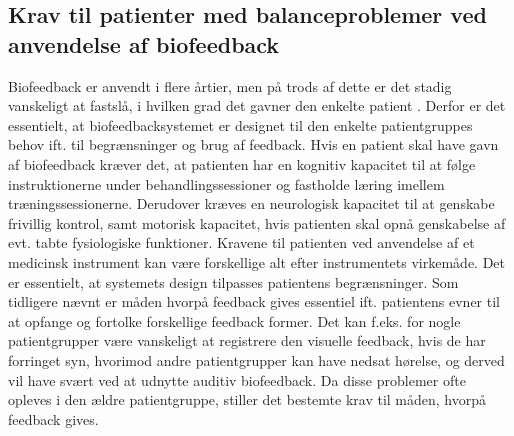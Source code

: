 \subsection{Krav til patienter med balanceproblemer ved anvendelse af biofeedback}
\label{Krav_biofeedback}
Biofeedback er anvendt i flere årtier, men på trods af dette er det stadig vanskeligt at fastslå, i hvilken grad det gavner den enkelte patient \cite{Glanz1997}. Derfor er det essentielt, at biofeedbacksystemet er designet til den enkelte patientgruppes behov ift. til  begrænsninger og brug af feedback. Hvis en patient skal have gavn af biofeedback kræver det, at patienten har en kognitiv kapacitet til at følge instruktionerne under behandlingssessioner og fastholde læring imellem træningssessionerne. Derudover kræves en neurologisk kapacitet til at genskabe frivillig kontrol, samt motorisk kapacitet, hvis patienten skal opnå genskabelse af evt. tabte fysiologiske funktioner. \cite{Middaugh1989} Kravene til patienten ved anvendelse af et medicinsk instrument kan være forskellige alt efter instrumentets virkemåde. Det er essentielt, at systemets design tilpasses patientens begrænsninger. Som tidligere nævnt er måden hvorpå feedback gives essentiel ift. patientens evner til at opfange og fortolke forskellige feedback former. Det kan f.eks. for nogle patientgrupper være vanskeligt at registrere den visuelle feedback, hvis de har forringet syn, hvorimod andre patientgrupper kan have nedsat hørelse, og derved vil have svært ved at udnytte auditiv biofeedback. Da disse problemer ofte opleves i den ældre patientgruppe, stiller det bestemte krav til måden, hvorpå feedback gives. \cite{Sundhedsstyrelsen2011}  \\









